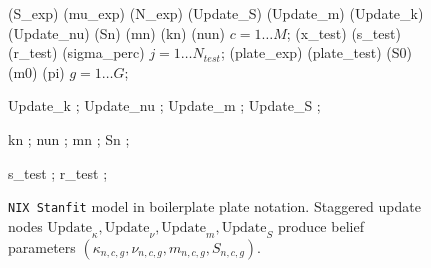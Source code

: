 \documentclass[11pt]{report}
\begin{document}
\begin{figure}[htbp]
{{    %
     {(S_exp) (mu_exp) (N_exp) (Update_S) (Update_m) (Update_k) (Update_nu) (Sn) (mn) (kn) (nun)} {$c = 1 \dots M$}; %
     {(x_test) (s_test) (r_test) (sigma_perc)} {$j = 1 \dots N_{test}$}; %
     {(plate_exp) (plate_test) (S0) (m0) (pi)} {$g = 1 \dots G$}; %

     {Update_k} ; %
     {Update_nu} ; %
     {Update_m} ; %
     {Update_S} ; %

     {kn} ; %
     {nun} ; %
     {mn} ; %
     {Sn} ; %

     {s_test} ; %
     {r_test} ; %
  }}
  \caption{\texttt{NIX Stanfit} model in boilerplate plate notation. Staggered update nodes $\text{Update}_\kappa, \text{Update}_\nu, \text{Update}_m, \text{Update}_S$ produce belief parameters $(\kappa_{n,c,g}, \nu_{n,c,g}, m_{n,c,g}, S_{n,c,g})$.}
\end{figure}
\end{document}
